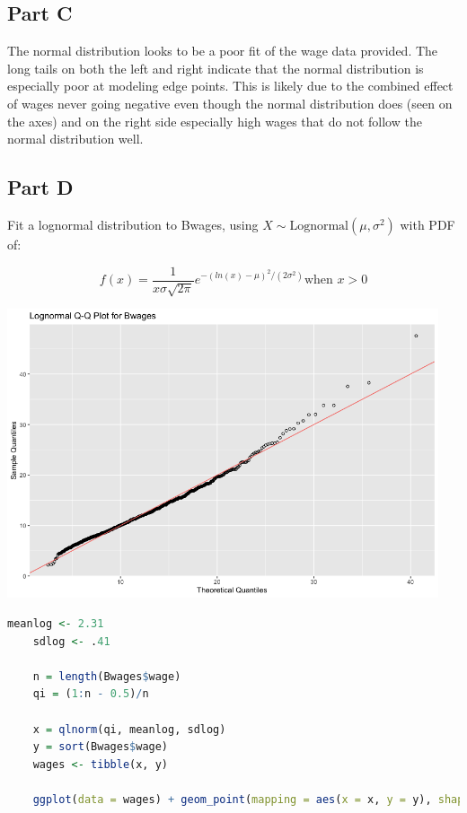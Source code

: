 \documentclass[letterpaper]{article}
\begin{document}
\subsection*{Part C}

The normal distribution looks to be a poor fit of the wage data provided. The long tails on both the left and right indicate that the normal distribution is especially poor at modeling edge points. This is likely due to the combined effect of wages never going negative even though the normal distribution does (seen on the axes) and on the right side especially high wages that do not follow the normal distribution well.

\subsection*{Part D}

Fit a lognormal distribution to Bwages, using $X \sim \text{Lognormal} (\mu, \sigma^2)$ with PDF of:

$$f(x) = \frac{1}{x \sigma \sqrt{2 \pi}} e^{-(ln(x) - \mu)^2 / (2 \sigma^2)} \text{when } x > 0$$

\begin{center}
    \includegraphics[width=5in]{LogQQPlot.png}
\end{center}

\begin{lstlisting}[language=R]
    meanlog <- 2.31
    sdlog <- .41

    n = length(Bwages$wage)
    qi = (1:n - 0.5)/n

    x = qlnorm(qi, meanlog, sdlog)
    y = sort(Bwages$wage)
    wages <- tibble(x, y)

    ggplot(data = wages) + geom_point(mapping = aes(x = x, y = y), shape = 1) + geom_abline(intercept = 0, slope = 1, color = "#F8766D") + xlab("Theoretical Quantiles") + ylab("Sample Quantiles") + ggtitle("Lognormal Q-Q Plot for Bwages")
\end{lstlisting}
\end{document}
